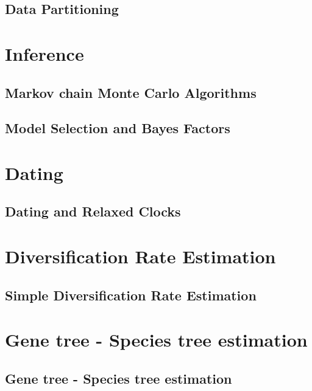 \documentclass[11pt]{book}
\begin{document}
\chapter{Data Partitioning}
\def \ResourcePath {RB_Partition_Tutorial/}




\part{Inference}

\chapter{Markov chain Monte Carlo Algorithms}


\chapter{Model Selection and Bayes Factors}



\part{Dating}
\chapter{Dating and Relaxed Clocks}



\part{Diversification Rate Estimation}
\chapter{Simple Diversification Rate Estimation}



\part{Gene tree - Species tree estimation}
\chapter{Gene tree - Species tree estimation}

\end{document}
